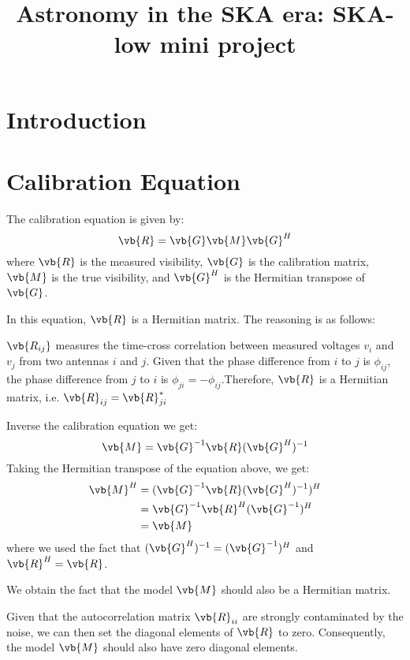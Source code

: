 \documentclass[10pt,a4paper,twocolumn]{paper}
\newcommand{\topic}{Astronomy in the SKA era: SKA-low mini project}
\begin{document}
\title{\topic}
\begin{titlepage}
    \maketitle
\end{titlepage}

\newpage

\section*{Introduction}

\section{Calibration Equation}
The calibration equation is given by:
\begin{equation}
    \vb{R} = \vb{G}\vb{M}\vb{G}^{H}
\end{equation}
where $\vb{R}$ is the measured visibility, $\vb{G}$ is the calibration matrix, $\vb{M}$ is the true visibility, and $\vb{G}^{H}$ is the Hermitian transpose of $\vb{G}$. 

In this equation, $\vb{R}$ is a Hermitian matrix. The reasoning is as follows:

$\vb{R_{ij}}$ measures the time-cross correlation between measured voltages $v_i$ and $v_j$ from two antennas $i$ and $j$. Given that the phase difference from $i$ to $j$ is $\phi_{ij}$, the phase difference from $j$ to $i$ is $\phi_{ji} = -\phi_{ij}$.Therefore, $\vb{R}$ is a Hermitian matrix, i.e. $\vb{R}_{ij} = \vb{R}_{ji}^{*}$

Inverse the calibration equation we get:
\begin{equation}
    \vb{M} = \vb{G}^{-1}\vb{R}(\vb{G}^{H})^{-1}
\end{equation}
Taking the Hermitian transpose of the equation above, we get:
\begin{align}
    \vb{M}^{H} &= (\vb{G}^{-1}\vb{R}(\vb{G}^{H})^{-1})^{H}\\
    &= \vb{G}^{-1}\vb{R}^{H}(\vb{G}^{-1})^{H}\\
    &= \vb{M}
\end{align}
where we used the fact that $(\vb{G}^{H})^{-1} = (\vb{G}^{-1})^{H}$ and $\vb{R}^{H} = \vb{R}$.

We obtain the fact that the model $\vb{M}$ should also be a Hermitian matrix.

Given that the autocorrelation matrix $\vb{R}_{ii}$ are strongly contaminated by the noise, we can then set the diagonal elements of $\vb{R}$ to zero. Consequently, the model $\vb{M}$ should also have zero diagonal elements.
\end{document}
